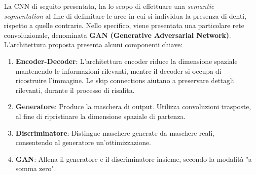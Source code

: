 \documentclass[12pt,a4paper,openright,twoside]{book}
\begin{document}
La CNN di seguito presentata, ha lo scopo di effettuare una {\itshape semantic segmentation} al fine di delimitare le aree in cui si individua la presenza di denti, rispetto a quelle contrarie. Nello specifico, viene presentata una particolare rete convoluzionale, denominata \textbf{GAN (Generative Adversarial Network)}.\\

L'architettura proposta presenta alcuni componenti chiave:
\begin{enumerate}
\item \textbf{Encoder-Decoder}: L'architettura encoder riduce la dimensione spaziale mantenendo le informazioni rilevanti, mentre il decoder si occupa di ricostruire l'immagine. Le skip connections aiutano a preservare dettagli rilevanti, durante il processo di risalita.
\item \textbf{Generatore}: Produce la maschera di output. Utilizza convoluzioni trasposte, al fine di ripristinare la dimensione spaziale di partenza.
\item \textbf{Discriminatore}: Distingue maschere generate da maschere reali, consentendo al generatore un'ottimizzazione.
\item \textbf{GAN}: Allena il generatore e il discriminatore insieme, secondo la modalità  "a somma zero".
\end{enumerate}
\end{document}
